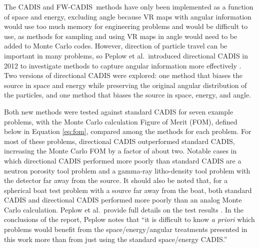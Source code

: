 \documentclass{article} %
\newcommand{\fwc}{\mbox{FW-CADIS}}
\begin{document}
The CADIS and \fwc\ methods have only been implemented as a function of space
and energy, excluding angle because VR maps with angular information would use
too much memory for engineering problems and would be difficult to use, as
methods for sampling and using VR maps in angle would need to be added to Monte
Carlo codes. However, direction of particle travel can be important in many
problems, so Peplow et al.\ introduced directional CADIS in 2012 to investigate
methods to capture angular information more effectively \cite{peplow}. Two
versions of directional CADIS were explored: one method that biases the source
in space and energy while preserving the original angular distribution of the
particles, and one method that biases the source in space, energy, and angle.

Both new methods were tested against standard
CADIS for seven example problems, with the Monte Carlo calculation Figure of
Merit (FOM), defined below in Equation \eqref{eq:fom}, compared among the
methods for each problem. For most of these problems, directional CADIS
outperformed standard CADIS, increasing the Monte Carlo FOM by a factor of
about two. Notable cases in which directional CADIS performed more poorly than
standard CADIS are a neutron porosity tool problem and a gamma-ray litho-density
tool problem with the detector far away from the source. It should
also be noted that, for a spherical boat test problem with a source far away
from the boat, both standard CADIS and directional CADIS performed more poorly
than an analog Monte Carlo calculation. Peplow et al.\ provide full details on
the test results \cite{peplow}. In the conclusions of the
report, Peplow notes that ``it is difficult to know \textit{a priori} which
problems would benefit from the space/energy/angular treatments presented in
this work more than from just using the standard space/energy CADIS.''
\end{document}
